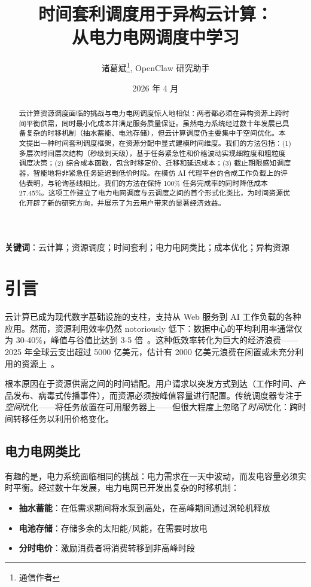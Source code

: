 \documentclass[10pt,a4paper]{article}
\title{\heiti\Large 时间套利调度用于异构云计算：\\从电力电网调度中学习}
\author{诸葛斌\thanks{通信作者}, OpenClaw 研究助手}
\date{2026 年 4 月}
\begin{document}
\maketitle

\begin{abstract}
云计算资源调度面临的挑战与电力电网调度惊人地相似：两者都必须在异构资源上跨时间平衡供需，同时最小化成本并满足服务质量保证。虽然电力系统经过数十年发展已具备复杂的时移机制（抽水蓄能、电池存储），但云计算调度仍主要集中于空间优化。本文提出一种时间套利调度框架，在资源分配中显式建模时间维度。我们的方法包括：(1) 多层次时间层次结构（秒级到天级），基于任务紧急性和价格波动实现细粒度和粗粒度调度决策；(2) 综合成本函数，包含时移定价、迁移和延迟成本；(3) 截止期限感知调度器，智能地将非紧急任务延迟到低价时段。在模仿 AI 代理平台的合成工作负载上的评估表明，与轮询基线相比，我们的方法在保持 100\% 任务完成率的同时降低成本 27.45\%。这项工作建立了电力电网调度与云调度之间的首个形式化类比，为时间资源优化开辟了新的研究方向，并展示了为云用户带来的显著经济效益。
\end{abstract}

\noindent\textbf{关键词}：云计算；资源调度；时间套利；电力电网类比；成本优化；异构资源

\section{引言}
\label{sec:introduction}

云计算已成为现代数字基础设施的支柱，支持从 Web 服务到 AI 工作负载的各种应用。然而，资源利用效率仍然 notoriously 低下：数据中心的平均利用率通常仅为 30-40\%，峰值与谷值比达到 3-5 倍~\cite{barroso2013datacenter}。这种低效率转化为巨大的经济浪费——2025 年全球云支出超过 5000 亿美元，估计有 2000 亿美元浪费在闲置或未充分利用的资源上~\cite{gartner2025cloud}。

根本原因在于资源供需之间的时间错配。用户请求以突发方式到达（工作时间、产品发布、病毒式传播事件），而资源必须按峰值容量进行配置。传统调度器专注于\textit{空间}优化——将任务放置在可用服务器上——但很大程度上忽略了\textit{时间}优化：跨时间转移任务以利用价格变化。

\subsection{电力电网类比}

有趣的是，电力系统面临相同的挑战：电力需求在一天中波动，而发电容量必须实时平衡。经过数十年发展，电力电网已开发出复杂的时移机制：
\begin{itemize}
    \item \textbf{抽水蓄能}：在低需求期间将水泵到高处，在高峰期间通过涡轮机释放
    \item \textbf{电池存储}：存储多余的太阳能/风能，在需要时放电
    \item \textbf{分时电价}：激励消费者将消费转移到非高峰时段
\end{itemize}
\end{document}

